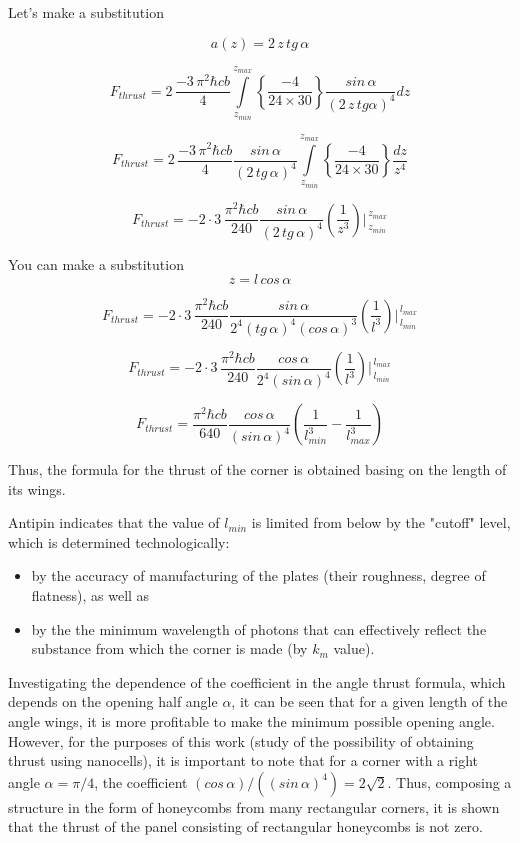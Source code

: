 \documentclass[11pt]{article}
\begin{document}
Let's make a substitution

\[a\left(z\right) = 2\,z\,tg\, \alpha\]

\[F_{thrust} = 2\, \frac{-3\,\pi^2\hbar c b}{4}\int\limits_{z_{min}}^{z_{max}} \left\{\frac{-4}{24\times30}\right\}\frac{sin\, \alpha}{\left(2\,z\,tg \alpha\right)^4}dz\]

\[F_{thrust} = 2\, \frac{-3\,\pi^2\hbar c b}{4} \frac{sin\, \alpha}{\left(2\,tg\, \alpha\right)^4} \int\limits_{z_{min}}^{z_{max}} \left\{\frac{-4}{24\times30}\right\} \frac{dz}{z^4}\]

\[F_{thrust} = -2\cdot3\, \frac{\pi^2\hbar c b}{240} \frac{sin\, \alpha}{\left(2\,tg\, \alpha\right)^4} \left(\frac{1}{z^3}\right)\Bigg\rvert_{\,z_{min}}^{\,z_{max}} \]

    You can make a substitution \[z = l\, cos\, \alpha\]

\[F_{thrust} = -2\cdot3\, \frac{\pi^2\hbar c b}{240} \frac{sin\, \alpha}{2^4\left(tg\,\alpha\right)^4\left(cos\, \alpha\right)^3} \left(\frac{1}{l^3}\right)\Bigg\rvert_{\,l_{min}}^{\,l_{max}} \]

\[F_{thrust} = -2\cdot3\, \frac{\pi^2\hbar c b}{240} \frac{cos\, \alpha}{2^4\left(sin\, \alpha\right)^4} \left(\frac{1}{l^3}\right)\Bigg\rvert_{\,l_{min}}^{\,l_{max}} \]

\[F_{thrust} = \frac{\pi^2\hbar c b}{640} \frac{cos\, \alpha}{\left(sin\, \alpha\right)^4} \left(\frac{1}{l_{min}^3} - \frac{1}{l_{max}^3}\right)\]

Thus, the formula for the thrust of the corner is obtained basing on the
length of its wings.

Antipin indicates that the value of \(l_{min}\) is limited from below by
the "cutoff" level, which is determined technologically:

\begin{itemize}
\item
  by the accuracy of manufacturing of the plates (their roughness,
  degree of flatness), as well as
\item
  by the the minimum wavelength of photons that can effectively reflect
  the substance from which the corner is made (by \(k_m\) value).
\end{itemize}

    Investigating the dependence of the coefficient in the angle thrust
formula, which depends on the opening half angle \(\alpha\), it can be
seen that for a given length of the angle wings, it is more profitable
to make the minimum possible opening angle. However, for the purposes of
this work (study of the possibility of obtaining thrust using
nanocells), it is important to note that for a corner with a right angle
\(\alpha = {\pi}/{4}\), the coefficient
\(\left({cos\, \alpha}\right)\big/\left({\left(sin\, \alpha\right)^4}\right) = 2\sqrt{2}\).
Thus, composing a structure in the form of honeycombs from many
rectangular corners, it is shown that the thrust of the panel consisting
of rectangular honeycombs is not zero.
\end{document}
